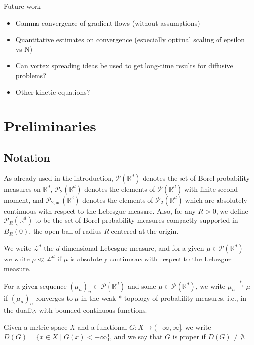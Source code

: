\documentclass[11pt,leqno]{amsart}
\theoremstyle{definition}
\newtheorem{defi}[thm]{DEFINITION}
\newcommand{\bes}{\begin{equation*}}
\newcommand{\ees}{\end{equation*}}
\newcommand{\R}{{\mathord{\mathbb R}}}
\newcommand{\Rd}{{\mathord{\mathbb R}^d}}
\newcommand{\N}{{\mathord{\mathbb N}}}
\newcommand{\wsto}{\stackrel{*}{\rightharpoonup}}
\def\P{{\mathcal P}}
\def\Pac{\mathcal{P}_{\mathrm{2,ac}}}
\newcommand{\ird}{\int_{\mathord{\mathbb R}^d}}
\begin{document}
 Future work
\begin{itemize}
\item Gamma convergence of gradient flows (without assumptions)
\item Quantitative estimates on convergence (especially optimal scaling of epsilon vs N)
\item Can vortex spreading ideas be used to get  long-time results for diffusive problems?
\item Other kinetic equations?
\end{itemize}

\section{Preliminaries}
\subsection{Notation}
As already used in the introduction, $\P(\Rd)$ denotes the set of Borel probability measures on $\Rd$, $\P_2(\Rd)$ denotes the elements of $\P(\Rd)$ with finite second moment, and $\Pac(\Rd)$ denotes the elements of $\P_2(\Rd)$ which are absolutely continuous with respect to the Lebesgue measure. Also, for any $R>0$, we define $\P_R(\R^d)$ to be the set of Borel probability measures compactly supported in $B_R(0)$, the open ball of radius $R$ centered at the origin.

We write $\mathcal{L}^d$ the $d$-dimensional Lebesgue measure, and for a given $\mu\in\P(\Rd)$ we write $\mu \ll \mathcal{L}^d$ if $\mu$ is absolutely continuous with respect to the Lebesgue measure.

For a given sequence $(\mu_n)_n \subset \P(\Rd)$ and some $\mu\in\P(\Rd)$, we write $\mu_n \wsto \mu$ if $(\mu_n)_n$ converges to $\mu$ in the weak-* topology of probability measures, i.e., in the duality with bounded continuous functions. 

Given a metric space $X$ and a functional $G\colon X \to (-\infty,\infty]$, we write $D(G) = \{ x\in X \mid G(x) < +\infty\}$, and we say that $G$ is proper if $D(G) \neq \emptyset$.

\end{document}
